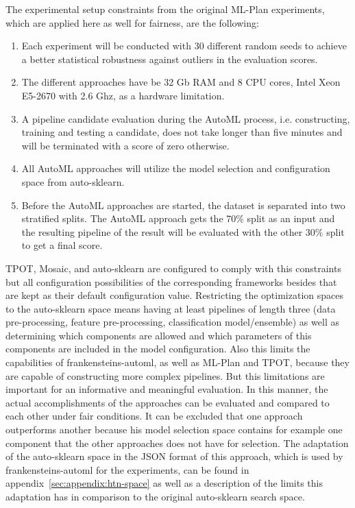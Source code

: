 The experimental setup constraints from the original ML-Plan experiments, which are applied here as well for fairness, are the following:
\begin{enumerate}
    \item Each experiment will be conducted with 30 different random seeds to achieve a better statistical robustness against outliers in the evaluation scores.
    \item The different approaches have be 32 Gb RAM and 8 CPU cores, Intel Xeon E5-2670 with 2.6 Ghz, as a hardware limitation.
    \item A pipeline candidate evaluation during the AutoML process, i.e. constructing, training and testing a candidate, does not take longer than five minutes and will be terminated with a score of zero otherwise.
    \item All AutoML approaches will utilize the model selection and configuration space from auto-sklearn.
    \item Before the AutoML approaches are started, the dataset is separated into two stratified splits. The AutoML approach gets the 70\% split as an input and the resulting pipeline of the result will be evaluated with the other 30\% split to get a final score.
\end{enumerate}
TPOT, Mosaic, and auto-sklearn are configured to comply with this constraints but all configuration possibilities of the corresponding frameworks besides that are kept as their default configuration value.\newline
Restricting the optimization spaces to the auto-sklearn space means having at least pipelines of length three (data pre-processing, feature pre-processing, classification model/ensemble) as well as determining which components are allowed and which parameters of this components are included in the model configuration.
Also this limits the capabilities of frankensteins-automl, as well as ML-Plan and TPOT, because they are capable of constructing more complex pipelines.
But this limitations are important for an informative and meaningful evaluation.
In this manner, the actual accomplishments of the approaches can be evaluated and compared to each other under fair conditions.
It can be excluded that one approach outperforms another because his model selection space contains for example one component that the other approaches does not have for selection.\newline
The adaptation of the auto-sklearn space in the JSON format of this approach, which is used by frankensteins-automl for the experiments, can be found in appendix~\ref{sec:appendix:htn-space} as well as a description of the limits this adaptation has in comparison to the original auto-sklearn search space.

